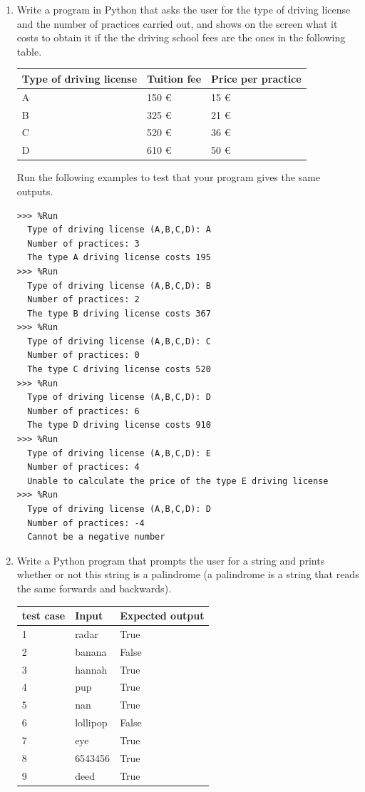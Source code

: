 \begin{enumerate}
\item Write a program in Python that asks the user for the type of driving license and the number of practices carried out, and shows on the screen what it costs to obtain it if the the driving school fees are the ones in the following table.

\begin{tabular}{|l|l|l|}
\hline
Type of driving license & Tuition fee & Price per practice \\
\hline\hline
A              & 150   €                    & 15   €                \\
\hline
B              & 325   €                    & 21   €                \\
\hline
C              & 520   €                    & 36   €                \\
\hline
D              & 610   €                    & 50   €  \\
\hline
\end{tabular}

Run the following examples to test that your program gives the same outputs.

\begin{Verbatim}[frame=single, label={\em example test execution of the program}]
>>> %Run 
  Type of driving license (A,B,C,D): A
  Number of practices: 3
  The type A driving license costs 195
>>> %Run 
  Type of driving license (A,B,C,D): B
  Number of practices: 2
  The type B driving license costs 367
>>> %Run 
  Type of driving license (A,B,C,D): C
  Number of practices: 0
  The type C driving license costs 520
>>> %Run 
  Type of driving license (A,B,C,D): D
  Number of practices: 6
  The type D driving license costs 910
>>> %Run 
  Type of driving license (A,B,C,D): E
  Number of practices: 4
  Unable to calculate the price of the type E driving license
>>> %Run 
  Type of driving license (A,B,C,D): D
  Number of practices: -4
  Cannot be a negative number
\end{Verbatim}


\item Write a Python program that prompts the user for a string and prints whether or not this string is a palindrome (a palindrome is a string that reads the same forwards and backwards).

\begin{tabular}{|l|l|l|}
\hline
test case & Input & Expected output \\
\hline\hline
1 & radar & True \\
2 & banana & False \\
3 & hannah & True \\
4 & pup &  True \\
5 & nan &  True \\
6 & lollipop & False \\
7 & eye & True \\
8 & 6543456 & True \\
9 & deed & True \\
\hline
\end{tabular}




\end{enumerate}
